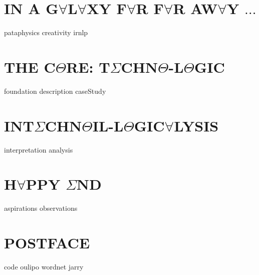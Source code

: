 \documentclass[oneside]{thesis}
\begin{document}
\part{\texorpdfstring{IN A G$\forall$L$\forall$XY F$\forall$R F$\forall$R AW$\forall$Y $\ldots$}{IN A GALAXY FAR FAR AWAY...}}
{pataphysics}
{creativity}
{irnlp}

\part{\texorpdfstring{THE C$\Theta$RE: T$\Sigma$CHN$\Theta$-L$\Theta$GIC}{THE CORE: TECHNO-LOGIC}}
{foundation}
{description}
{caseStudy}

\part{\texorpdfstring{INT$\Sigma$CHN$\Theta$IL-L$\Theta$GIC$\forall$LYSIS}{INTECHNOIL-LOGICALYSIS}}
{interpretation}
{analysis}

\part{\texorpdfstring{H$\forall$PPY $\Sigma$ND}{HAPPILY EVER AFTER}}
{aspirations}
{observations}

\appendix

\part*{\texorpdfstring{POSTFACE}{POSTFACE}}
{code}
{oulipo}
{wordnet}
{jarry}
\clearpage

\pagestyle{plain}
{}
\clearpage

{}
\printnoidxglossary
\clearpage
\end{document}
